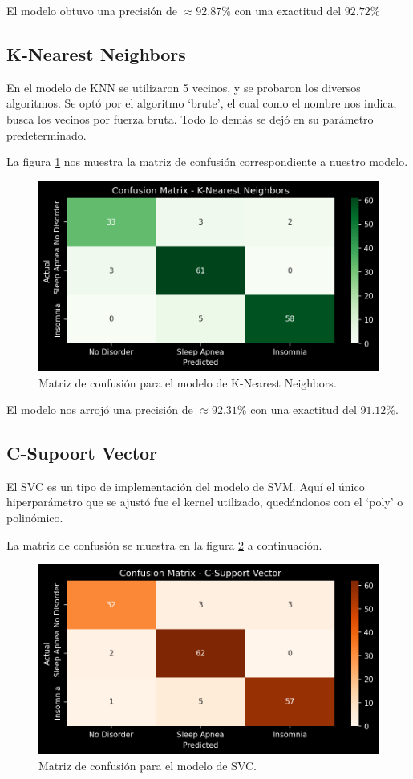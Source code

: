 \documentclass{replab}
\begin{document}
El modelo obtuvo una precisión de $\approx 92.87\%$ con una exactitud del $92.72\%$

    \subsection{K-Nearest Neighbors}

En el modelo de KNN se utilizaron 5 vecinos, y se probaron los diversos algoritmos. Se optó por el algoritmo `brute', el cual como el nombre nos indica, busca los vecinos por fuerza bruta. Todo lo demás se dejó en su parámetro predeterminado.

La figura \ref{fig:matrizKNN} nos muestra la matriz de confusión correspondiente a nuestro modelo.

\begin{figure}[hbt!]
    \centering
    \includegraphics[width=0.85\columnwidth]{imagenes/KNN.png}
    \caption{Matriz de confusión para el modelo de K-Nearest Neighbors.}
    \label{fig:matrizKNN}
\end{figure}

El modelo nos arrojó una precisión de $\approx 92.31\%$ con una exactitud del $91.12\%$.

    \subsection{C-Supoort Vector}

El SVC es un tipo de implementación del modelo de SVM. Aquí el único hiperparámetro que se ajustó fue el kernel utilizado, quedándonos con el `poly' o polinómico.

La matriz de confusión se muestra en la figura \ref{fig:matrizSVC} a continuación.

\begin{figure}[hbt!]
    \centering
    \includegraphics[width=0.85\columnwidth]{imagenes/SVC.png}
    \caption{Matriz de confusión para el modelo de SVC.}
    \label{fig:matrizSVC}
\end{figure}
\end{document}
